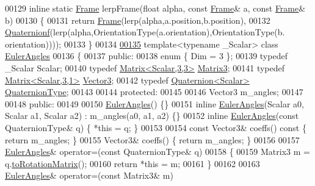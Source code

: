\begin{DoxyCode}
00129 \textcolor{keyword}{inline} \textcolor{keyword}{static} \hyperlink{class_frame}{Frame} lerpFrame(\textcolor{keywordtype}{float} alpha, \textcolor{keyword}{const} \hyperlink{class_frame}{Frame}& a, \textcolor{keyword}{const} \hyperlink{class_frame}{Frame}& b)
00130 \{
00131   \textcolor{keywordflow}{return} \hyperlink{class_frame}{Frame}(lerp(alpha,a.position,b.position),
00132                \hyperlink{group___geometry___module_class_eigen_1_1_quaternion}{Quaternionf}(lerp(alpha,OrientationType(a.orientation),OrientationType(b.
      orientation))));
00133 \}
00134 
\hyperlink{class_euler_angles}{00135} \textcolor{keyword}{template}<\textcolor{keyword}{typename} \_Scalar> \textcolor{keyword}{class }\hyperlink{class_eigen_1_1_euler_angles}{EulerAngles}
00136 \{
00137 \textcolor{keyword}{public}:
00138   \textcolor{keyword}{enum} \{ Dim = 3 \};
00139   \textcolor{keyword}{typedef} \_Scalar Scalar;
00140   \textcolor{keyword}{typedef} \hyperlink{group___core___module_class_eigen_1_1_matrix}{Matrix<Scalar,3,3>} \hyperlink{group___core___module_class_eigen_1_1_matrix}{Matrix3};
00141   \textcolor{keyword}{typedef} \hyperlink{group___core___module}{Matrix<Scalar,3,1>} \hyperlink{group___core___module}{Vector3};
00142   \textcolor{keyword}{typedef} \hyperlink{group___geometry___module_class_eigen_1_1_quaternion}{Quaternion<Scalar>} \hyperlink{group___geometry___module_class_eigen_1_1_quaternion}{QuaternionType};
00143 
00144 \textcolor{keyword}{protected}:
00145 
00146   Vector3 m\_angles;
00147 
00148 \textcolor{keyword}{public}:
00149 
00150   \hyperlink{class_eigen_1_1_euler_angles}{EulerAngles}() \{\}
00151   \textcolor{keyword}{inline} \hyperlink{class_eigen_1_1_euler_angles}{EulerAngles}(Scalar a0, Scalar a1, Scalar a2) : m\_angles(a0, a1, a2) \{\}
00152   \textcolor{keyword}{inline} \hyperlink{class_eigen_1_1_euler_angles}{EulerAngles}(\textcolor{keyword}{const} QuaternionType& q) \{ *\textcolor{keyword}{this} = q; \}
00153 
00154   \textcolor{keyword}{const} Vector3& coeffs()\textcolor{keyword}{ const }\{ \textcolor{keywordflow}{return} m\_angles; \}
00155   Vector3& coeffs() \{ \textcolor{keywordflow}{return} m\_angles; \}
00156 
00157   \hyperlink{class_eigen_1_1_euler_angles}{EulerAngles}& operator=(\textcolor{keyword}{const} QuaternionType& q)
00158   \{
00159     Matrix3 m = q.\hyperlink{group___geometry___module_a621c71eec9680bf77342b28a473b6874}{toRotationMatrix}();
00160     \textcolor{keywordflow}{return} *\textcolor{keyword}{this} = m;
00161   \}
00162 
00163   \hyperlink{class_eigen_1_1_euler_angles}{EulerAngles}& operator=(\textcolor{keyword}{const} Matrix3& m)

\end{DoxyCode}
